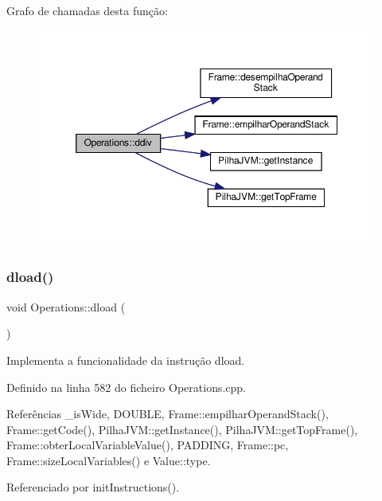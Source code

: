 Grafo de chamadas desta função\+:
\nopagebreak
\begin{figure}[H]
\begin{center}
\leavevmode
\includegraphics[width=350pt]{classOperations_a3c323c9f0d40e68bf54cd449a55618c3_cgraph}
\end{center}
\end{figure}
\mbox{\label{classOperations_af53b0b32da7737741c20b4e313eaac84}} 
\subsubsection{\texorpdfstring{dload()}{dload()}}
{\footnotesize\ttfamily void Operations\+::dload (\begin{DoxyParamCaption}{ }\end{DoxyParamCaption})\hspace{0.3cm}{\ttfamily [private]}}



Implementa a funcionalidade da instrução dload. 



Definido na linha 582 do ficheiro Operations.\+cpp.



Referências \+\_\+is\+Wide, D\+O\+U\+B\+LE, Frame\+::empilhar\+Operand\+Stack(), Frame\+::get\+Code(), Pilha\+J\+V\+M\+::get\+Instance(), Pilha\+J\+V\+M\+::get\+Top\+Frame(), Frame\+::obter\+Local\+Variable\+Value(), P\+A\+D\+D\+I\+NG, Frame\+::pc, Frame\+::size\+Local\+Variables() e Value\+::type.



Referenciado por init\+Instructions().

